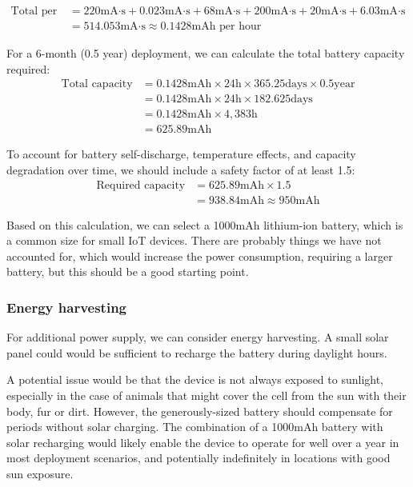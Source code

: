 \begin{align*}
\text{Total per hour} &= 220\text{mA·s} + 0.023\text{mA·s} + 68\text{mA·s} + 200\text{mA·s} + 20\text{mA·s} + 6.03\text{mA·s} \\
&= 514.053\text{mA·s} \approx 0.1428\text{mAh per hour}
\end{align*}

For a 6-month (0.5 year) deployment, we can calculate the total battery capacity required:
\begin{align*}
\text{Total capacity} &= 0.1428\text{mAh} \times 24\text{h} \times 365.25\text{days} \times 0.5\text{year} \\
&= 0.1428\text{mAh} \times 24\text{h} \times 182.625\text{days} \\
&= 0.1428\text{mAh} \times 4,383\text{h} \\
&= 625.89\text{mAh}
\end{align*}

To account for battery self-discharge, temperature effects, and capacity degradation over time, we should include a safety factor of at least 1.5:
\begin{align*}
\text{Required capacity} &= 625.89\text{mAh} \times 1.5 \\
&= 938.84\text{mAh} \approx 950\text{mAh}
\end{align*}

Based on this calculation, we can select a 1000mAh lithium-ion battery, which is a common size for small IoT devices. There are probably things we have not accounted for, which would increase the power consumption, requiring a larger battery, but this should be a good starting point.

\subsubsection{Energy harvesting}
For additional power supply, we can consider energy harvesting.
A small solar panel could would be sufficient to recharge the battery during daylight hours.

A potential issue would be that the device is not always exposed to sunlight, especially in the case of animals that might cover the cell from the sun with their body, fur or dirt. However, the generously-sized battery should compensate for periods without solar charging. The combination of a 1000mAh battery with solar recharging would likely enable the device to operate for well over a year in most deployment scenarios, and potentially indefinitely in locations with good sun exposure.

